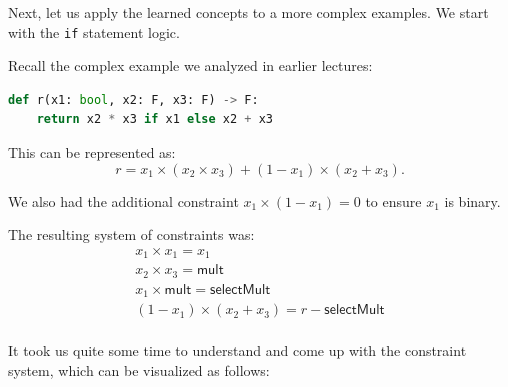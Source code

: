 \documentclass[../lecture-notes.tex]{subfiles}
\begin{document}
    Next, let us apply the learned concepts to a more complex examples. We start 
    with the \texttt{if} statement logic.

    \begin{example}
      Recall the complex example we analyzed in earlier lectures:

        \begin{lstlisting}[language=Python,numbers=none]
def r(x1: bool, x2: F, x3: F) -> F:
    return x2 * x3 if x1 else x2 + x3
        \end{lstlisting}

        This can be represented as:
        \[
            r = x_1 \times (x_2 \times x_3) + (1 - x_1) \times (x_2 + x_3).
        \]

        We also had the additional constraint $x_1 \times (1 - x_1) = 0$ to ensure $x_1$ is binary.

        The resulting system of constraints was:
        \begin{gather*}
            x_1 \times x_1 = x_1 \tag{1}\\
            x_2 \times x_3 = \mathsf{mult} \tag{2}\\
            x_1 \times \mathsf{mult} = \mathsf{selectMult} \tag{3}\\
            (1 - x_1) \times (x_2 + x_3) = r - \mathsf{selectMult} \tag{4}\\
        \end{gather*}
    \end{example}

    It took us quite some time to understand and come up with the constraint system, which can be visualized as follows:
\end{document}
